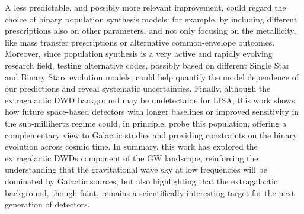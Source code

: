 A less predictable, and possibly more relevant improvement, could regard the choice of binary population synthesis models: for example, by including different prescriptions also on other parameters, and not only focusing on the metallicity, like mass transfer prescriptions or alternative common-envelope outcomes.
Moreover, since population synthesis is a very active and rapidly evolving research field, testing alternative codes, possibly based on different Single Star and Binary Stars evolution models, could help quantify the model dependence of our predictions and reveal systematic uncertainties.
Finally, although the extragalactic DWD background may be undetectable for LISA, this work shows how future space-based detectors with longer baselines or improved sensitivity in the sub-millihertz regime could, in principle, probe this population, offering a complementary view to Galactic studies and providing constraints on the binary evolution across cosmic time.
In summary, this work has explored the extragalactic DWDs component of the GW landscape, reinforcing the understanding that the gravitational wave sky at low frequencies will be dominated by Galactic sources, but also highlighting that the extragalactic background, though faint, remains a scientifically interesting target for the next generation of detectors.
